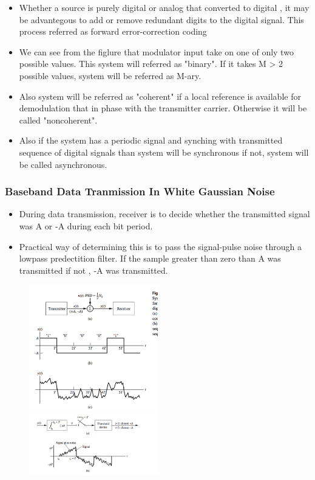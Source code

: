 \documentclass{beamer}
\begin{document}
			\begin{frame}
			\begin{itemize}
			\item Whether  a source is purely digital or analog that converted to digital , it may be advantegous to add or remove redundant  digits to the digital signal. This process referred as forward error-correction coding
			\item We can see from the figlure that modulator input take on one of only two possible values. This system will referred as "binary". If it takes M > 2 possible values, system will be referred as M-ary.
			\item Also system will be referred as "coherent" if a local reference is available for demodulation that in phase with the transmitter carrier. Otherwise it will be called "noncoherent".
			\item Also if the system has a periodic signal and synching with transmitted sequence of digital signals than system will be synchronous if not, system will be called asynchronous.
			\end{itemize}
			\end{frame}

			\begin{frame}
			\frametitle{Baseband Data Tranmission In White Gaussian Noise}
			\begin{itemize}
			\item  During data transmission, receiver is to decide whether the transmitted signal was A or -A during each bit period.
			\item Practical way of determining this is to pass the signal-pulse noise through a lowpass predectition filter. If the sample greater than zero than A was transmitted if not , -A was transmitted.
			\end{itemize}
			\end{frame}

			\begin{frame}
			\begin{figure}
			\includegraphics[width=0.5\textwidth]{9.png}
			\includegraphics[width=0.5\textwidth]{9-1.png}
			\end{figure}
			\end{frame}
\end{document}
